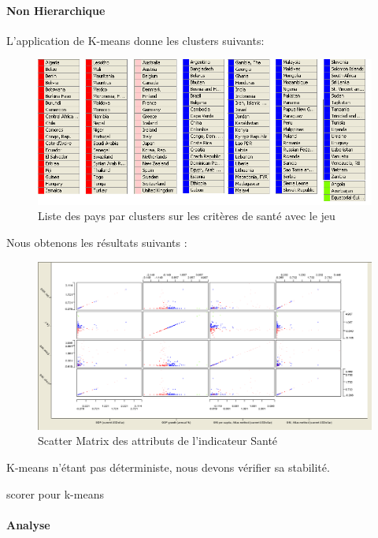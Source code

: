 \paragraph{Non Hierarchique}
L'application de K-means donne les clusters suivants: 

\begin{figure}[H]
	\begin{center}
		\includegraphics[scale=0.5]{Image/TableViewPolitiqueKmeansNomissing2}
		\caption{Liste des pays par clusters sur les critères de santé avec le jeu \jeuc}
	\end{center}
\end{figure}


Nous obtenons les résultats suivants : 

\begin{figure}[H]
	\begin{center}
		\includegraphics[scale=0.5]{Image/scattermatrixPolitiquekmeansNoMissing2}
		\caption{Scatter Matrix des attributs de l'indicateur Santé \jeuc}
	\end{center}
\end{figure}

K-means n'étant pas déterministe, nous devons vérifier sa stabilité.

\begin{Huge}


scorer pour k-means 
\end{Huge} 


\paragraph{Analyse}




